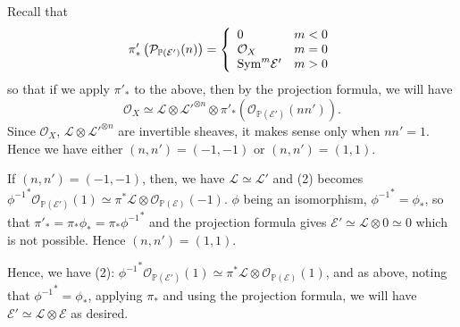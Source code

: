 \documentclass[11pt]{amsart}          %
\newcommand{\tuborg}{\left\{\begin{array}{ll}}
\newcommand{\sluttuborg}{\end{array}\right.}
\newcommand{\calO}{\mathcal{O}}
\newcommand{\calL}{\mathcal{L}}
\newcommand{\calE}{\mathcal{E}}
\newcommand{\calP}{\mathcal{P}}
\newcommand{\bbP}{\mathbb{P}}
\newcommand{\sym}{{\rm Sym}}
\begin{document}
Recall that $$\pi' _* \left( \calP_{\bbP(\calE')} (n) \right) = \tuborg 0 & m<0 \\ \calO_X & m=0 \\ \sym ^m \calE' & m>0 \sluttuborg$$ so that if we apply $\pi'_*$ to the above, then by the projection formula, we will have
$$\calO_X \simeq \calL \otimes {\calL'} ^{\otimes n} \otimes \pi'_* \left( \calO_{\bbP(\calE')} (nn') \right).$$ Since $\calO_X$, $\calL \otimes {\calL'} ^{\otimes n}$ are invertible sheaves, it makes sense only when $nn' =1$. Hence we have either $(n,n') = (-1, -1)$ or $(n,n') = (1,1)$.

If $(n,n') = (-1,-1)$, then, we have $\calL \simeq \calL'$ and (2) becomes ${\phi^{-1}}^* \calO_{\bbP(\calE')}(1) \simeq \pi^* \calL \otimes \calO_{\bbP(\calE)} (-1)$. $\phi$ being an isomorphism, ${\phi^{-1}}^* = \phi_*$, so that $\pi'_* = \pi_* \phi_* = \pi_* {\phi^{-1}}^*$ and the projection formula gives $\calE' \simeq \calL \otimes 0 \simeq 0$ which is not possible. Hence $(n,n') = (1,1)$.

Hence, we have (2): ${\phi^{-1}}^* \calO_{\bbP(\calE')}(1) \simeq \pi^* \calL \otimes \calO_{\bbP(\calE)} (1)$, and as above, noting that ${\phi^{-1}}^* = \phi_*$, applying $\pi_*$ and using the projection formula, we will have $\calE' \simeq \calL \otimes \calE$ as desired.
\end{document}
